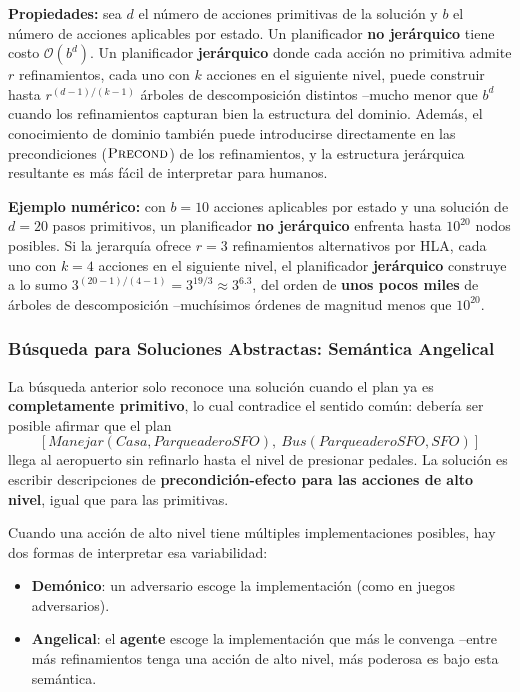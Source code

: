 \textbf{Propiedades:} sea $d$ el número de acciones primitivas de la solución y $b$ el número de
acciones aplicables por estado. Un planificador \textbf{no jerárquico} tiene costo
$\mathcal{O}(b^d)$. Un planificador \textbf{jerárquico} donde cada acción no primitiva admite $r$
refinamientos, cada uno con $k$ acciones en el siguiente nivel, puede construir hasta
$r^{(d-1)/(k-1)}$ árboles de descomposición distintos --mucho menor que $b^d$ cuando los
refinamientos capturan bien la estructura del dominio. Además, el conocimiento de dominio también
puede introducirse directamente en las precondiciones ($\textsc{Precond}$) de los refinamientos, y
la estructura jerárquica resultante es más fácil de interpretar para humanos.

\textbf{Ejemplo numérico:} con $b=10$ acciones aplicables por estado y una solución de $d=20$
pasos primitivos, un planificador \textbf{no jerárquico} enfrenta hasta $10^{20}$ nodos posibles. Si
la jerarquía ofrece $r=3$ refinamientos alternativos por HLA, cada uno con $k=4$ acciones en el
siguiente nivel, el planificador \textbf{jerárquico} construye a lo sumo
$3^{(20-1)/(4-1)} = 3^{19/3} \approx 3^{6.3}$, del orden de \textbf{unos pocos miles} de árboles de
descomposición --muchísimos órdenes de magnitud menos que $10^{20}$.

\subsubsection{Búsqueda para Soluciones Abstractas: Semántica Angelical}

La búsqueda anterior solo reconoce una solución cuando el plan ya es \textbf{completamente
primitivo}, lo cual contradice el sentido común: debería ser posible afirmar que el plan
\[
    [Manejar(Casa,ParqueaderoSFO),\ Bus(ParqueaderoSFO,SFO)]
\]
llega al aeropuerto sin refinarlo hasta el nivel de presionar pedales. La solución es escribir
descripciones de \textbf{precondición-efecto para las acciones de alto nivel}, igual que para las
primitivas.

\begin{definition}
Cuando una acción de alto nivel tiene múltiples implementaciones posibles, hay dos formas de
interpretar esa variabilidad:
\begin{itemize}
    \item \textbf{Demónico}: un adversario escoge la implementación (como en juegos adversarios).
    \item \textbf{Angelical}: el \textbf{agente} escoge la implementación que más le convenga --entre
    más refinamientos tenga una acción de alto nivel, más poderosa es bajo esta semántica.
\end{itemize}
\end{definition}

